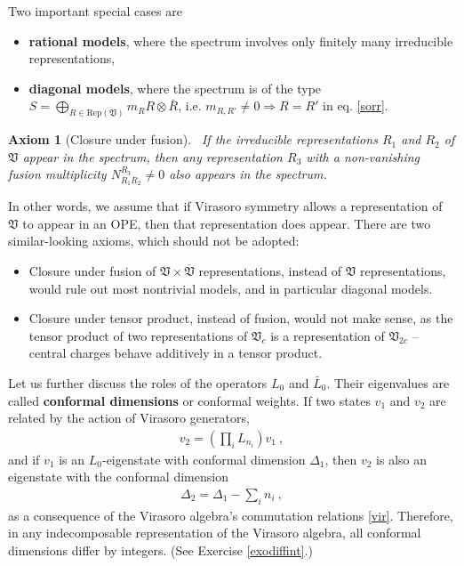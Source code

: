 \documentclass[12pt, a4paper, notitlepage, twoside]{report}
\numberwithin{equation}{section}
\theoremstyle{break}
\newtheorem{hyp}{Axiom}[chapter]
\begin{document}
Two important special cases are
\begin{itemize}
\item \textbf{\boldmath rational models}, where the spectrum involves only finitely many irreducible representations,
 \item \textbf{\boldmath diagonal models}, where the spectrum is of the type $S=\bigoplus_{R\in \text{Rep}(\mathfrak{V})} m_R R\otimes \bar{R}$, i.e. $m_{R,R'}\neq 0 \Rightarrow R=R'$ in eq. \eqref{sorr}.
\end{itemize}

\begin{hyp}[Closure under fusion]
~\label{ax:cuf}
If the irreducible representations $R_1$ and $R_2$ of $\mathfrak{V}$ appear in the spectrum, then any representation $R_3$ with a non-vanishing fusion multiplicity $N_{R_1R_2}^{R_3}\neq 0$ also appears in the spectrum. 
\end{hyp} 
\noindent
In other words, we assume that if Virasoro symmetry allows a representation of $\mathfrak{V}$ to appear in an OPE, then that representation does appear.
There are two similar-looking axioms, which should not be adopted:
\begin{itemize}
 \item Closure under fusion of $\mathfrak{V}\times \overline{\mathfrak{V}}$ representations, instead of $\mathfrak{V}$ representations, would rule out most nontrivial models, and in particular diagonal models. 
\item Closure under tensor product, instead of fusion, would not make sense, as the tensor product of two representations of $\mathfrak{V}_c$ is a representation of $\mathfrak{V}_{2c}$ -- central charges behave additively in a tensor product. 
\end{itemize}

Let us further discuss the roles of the operators $L_0$ and $\bar L_0$. Their eigenvalues are called \textbf{\boldmath conformal dimensions} or conformal weights. If 
two states $v_1$ and $v_2$ are related by the action of Virasoro generators,
\begin{align}
 v_2 = \left(\prod_i L_{n_i}\right) v_1\ ,
\label{vovt}
\end{align}
and if $v_1$ is an $L_0$-eigenstate with conformal dimension $\Delta_1$, then $v_2$ is also an eigenstate with the conformal dimension
\begin{align}
 \Delta_2 = \Delta_1 - \sum_i n_i\ ,
\label{ddsn}
\end{align}
as a consequence of the Virasoro algebra's commutation relations \eqref{vir}. Therefore, in any indecomposable representation of the Virasoro algebra, all conformal dimensions differ by integers. (See Exercise \ref{exodiffint}.)
\end{document}

